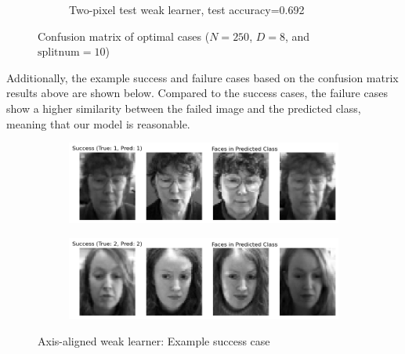 \begin{figure}[htbp]
\begin{subfigure}[t]{0.4\linewidth}
		\caption{Two-pixel test weak learner, test accuracy=0.692}
		\label{fig:q5-fig8}
	\end{subfigure}
	\caption{Confusion matrix of optimal cases ($N=250$, $D=8$, and $\text{splitnum}=10$)}
\end{figure}

Additionally, the example success and failure cases based on the confusion matrix results above are shown below. Compared to the success cases, the failure cases show a higher similarity between the failed image and the predicted class, meaning that our model is reasonable.
\begin{figure}[htbp]
	\centering
	\begin{subfigure}{0.45\linewidth}
		\centering
		\includegraphics[width=\linewidth]{image/q5-app/q5-axis-succ1.png}
	\end{subfigure}%
	\quad
	\begin{subfigure}{0.45\linewidth}
		\centering
		\includegraphics[width=\linewidth]{image/q5-app/q5-axis-succ2.png}
	\end{subfigure}
	\caption{Axis-aligned weak learner: Example success case}
\end{figure}
